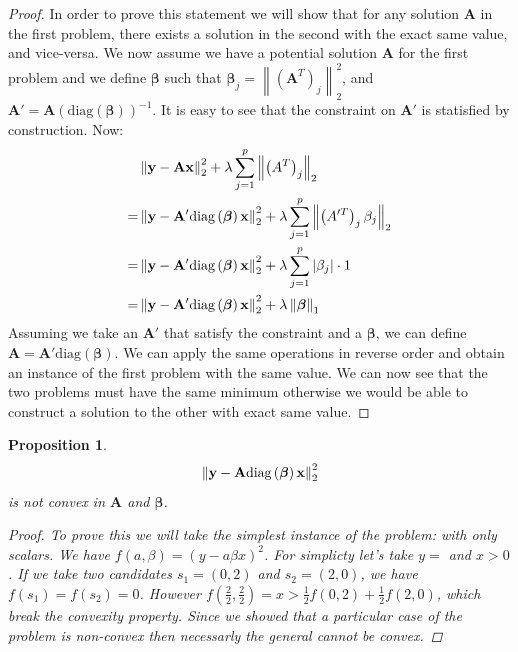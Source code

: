 \documentclass{article}
\newcommand{\norm}[1]{\left\lVert#1\right\rVert}
\newcommand{\abs}[1]{\left|#1\right|}
\newcommand{\diag}[1]{\text{diag}\left(#1\right)}
\newtheorem{proposition}{Proposition}[section]
\begin{document}
\begin{proof}
  In order to prove this statement we will show that for any solution $\bm{A}$ in the first problem, there exists a solution in the second with the exact same value, and vice-versa.
We now assume we have a potential solution $\bm{A}$ for the first problem and we define $\bm{\beta}$ such that $\bm{\beta}_j = \norm{\left(\bm{A}^T\right)_j}_2^2$, and $\bm{A}' = \bm{A}\left(\diag{\bm{\beta}}\right)^{-1}$. It is easy to see that the constraint on $\bm{A}'$ is statisfied by construction. Now:
  \begin{align*}
    & \norm{\bf{y} - \bf{A}\bf{x}}_2^2 + \lambda \sum_{j=1}^p \norm{\left(A^T\right)_j}_2 \\
    = &\norm{\bf{y} - \bf{A'}\diag{\bm{\beta}}\bf{x}}_2^2 + \lambda \sum_{j=1}^p \norm{\left(A'^T\right)_j\beta_j}_2 \\
    = &\norm{\bf{y} - \bf{A'}\diag{\bm{\beta}}\bf{x}}_2^2 + \lambda \sum_{j=1}^p \abs{\beta_j} \cdot 1\\
    = &\norm{\bf{y} - \bf{A'}\diag{\bm{\beta}}\bf{x}}_2^2 + \lambda \norm{\bm{\beta}}_1
  \end{align*}
  Assuming we take an $\bm{A}'$ that satisfy the constraint and a $\bm{\beta}$, we can define $\bm{A} = \bm{A'}\diag{\bm{\beta}}$. We can apply the same operations in reverse order and obtain an instance of the first problem with the same value. We can now see that the two problems must have the same minimum otherwise we would be able to construct a solution to the other with exact same value.
\end{proof}

\begin{proposition}
\label{unconstrained_non_convex}
\begin{equation*}
     \norm{\bf{y} - \bf{A}\diag{\bm{\beta}}\bf{x}}_2^2
\end{equation*}
is not convex in $\bm{A}$ and $\bm{\beta}$.
\begin{proof}
  To prove this we will take the simplest instance of the problem: with only scalars. We have $f(a, \beta) = \left(y - a\beta x\right)^2$. For simplicty let's take $y = $ and $x > 0$. If we take two candidates $s_1 = (0, 2)$ and $s_2 = (2, 0)$, we have $f(s_1) = f(s_2) = 0$. However $f(\frac{2}{2}, \frac{2}{2}) = x > \frac{1}{2} f(0, 2) + \frac{1}{2}f(2, 0)$, which break the convexity property. Since we showed that a particular case of the problem is non-convex then necessarly the general cannot be convex.
\end{proof}
\end{proposition}
\end{document}
